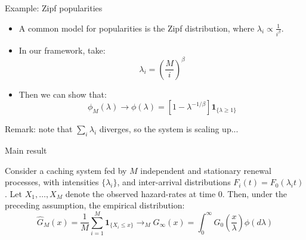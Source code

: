 \documentclass[aspectratio=169]{beamer}
\newcommand{\ind}[1]{\mathbf{1}_{#1}}
\newenvironment*{myitem}[1][1.5em]{\begin{itemize}\setlength{\itemsep}{#1}}{\end{itemize}}
\begin{document}
\begin{frame}{Example: Zipf popularities}
	
	\begin{myitem}
		\item A common model for popularities is the \alert{Zipf} distribution, where $\lambda_i \propto \frac{1}{i^\beta}$.
		\item In our framework, take:
			\begin{equation*}
				\lambda_i = \left(\frac{M}{i}\right)^\beta
			\end{equation*}
		\item Then we can show that:
		    \begin{equation*}
				\phi_M(\lambda) \to \phi(\lambda) = \left[1-\lambda^{-1/\beta}\right]\ind{\{\lambda\geqslant1\}}
			\end{equation*}
	\end{myitem}

	\vfill

	\alert{Remark:} note that $\sum_i \lambda_i$ diverges, so the system is scaling up...
\end{frame}
\begin{frame}{Main result}

	\begin{theorem}
		Consider a caching system fed by $M$ independent and stationary renewal processes, with intensities $\{\lambda_i\}$, and inter-arrival distributions $F_i(t)=F_0(\lambda_i t)$. Let $X_1,\ldots,X_M$ denote the observed hazard-rates at time $0$. Then, under the preceding assumption, the empirical distribution:
		\begin{equation*}
			\hat{G}_M(x) = \frac{1}{M}\sum_{i=1}^M \ind{\{X_i\leqslant x\}} \to_M G_\infty(x) = \int_0^\infty G_0\left(\frac{x}{\lambda}\right) \phi(d\lambda)
		\end{equation*}
	\end{theorem}

\end{frame}

	

\end{document}
